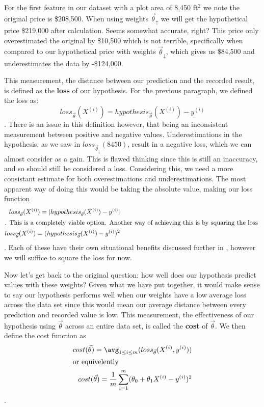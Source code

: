 For the first feature in our dataset with a plot area of 8,450 ft$^2$ we note the original price is \$208,500. When using weights $\vec\theta_{\uparrow}$ we will get the hypothetical price \$219,000 after calculation. Seems somewhat accurate, right? This price only overestimated the original by \$10,500 which is not terrible, specifically when compared to our hypothetical price  with weights $\vec\theta_{\downarrow}$, which gives us \$84,500 and underestimates the data by -\$124,000.

This measurement, the distance between our prediction and the recorded result,
is defined as the \textbf{loss} of our hypothesis. For the previous paragraph, we defined the loss as:
\begin{equation*}
	loss_{\vec\theta}(X^{(i)}) = hypothesis_{\vec\theta}(X^{(i)})-y^{(i)}
\end{equation*}
. There is an issue in this definition however, that being an inconsistent measurement between positive and negative values. Underestimations in the hypothesis, as we saw in $loss_{\vec\theta_{\downarrow}}(8450)$, result in a negative loss, which we can almost consider as a gain. This is flawed thinking since this is still an inaccuracy, and so should still be considered a loss. Considering this, we need a more consistant estimate for both overestimations and underestimations. The most apparent way of doing this would be taking the absolute value, making our loss function
\begin{subequations}
\begin{align}
	loss_{\vec\theta}(X^{(i)}) = |hypothesis_{\vec\theta}(X^{(i)}) - y^{(i)}| \\
	\intertext{. This is a completely viable option. Another way of achieving this is by squaring the loss }
	loss_{\vec\theta}(X^{(i)}) = (hypothesis_{\vec\theta}(X^{(i)}) - y^{(i)})^2
\end{align}
\end{subequations}
. Each of these have their own situational benefits discussed further in \placeholder, however we will suffice to square the loss for now.

Now let's get back to the original question: how well does our hypothesis
predict values with these weights? Given what we have put together, it would
make sense to say our hypothesis performs well when our weights have a low
average loss across the data set since this would mean our average distance
between every prediction and recorded value is low. This measurement, the
effectiveness of our hypothesis using $\vec\theta$ across an entire data set, is
called the \textbf{cost} of $\vec\theta$. We then define the cost function as
\begin{subequations}
    \begin{align}
        cost(\vec\theta) = \avg_{1\leq i\leq m} (loss_{\vec\theta}(X^{(i)}, y^{(i)})) \\
    \intertext{or equivelently}
        cost(\vec\theta) = \frac{1}{m}\sum_{i=1}^m (\theta_0 + \theta_1X^{(i)} -
        y^{(i)})^2
    \end{align}
\end{subequations}
.

